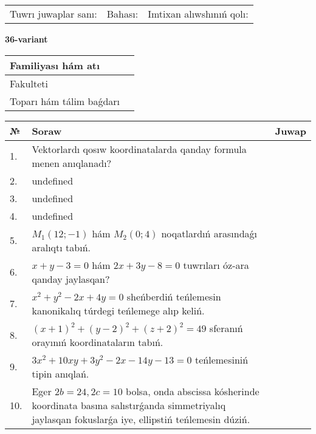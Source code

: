 \documentclass{article}
\begin{document}
\vspace{0.7cm}

\begin{tabular}{lll}
Tuwrı juwaplar sanı: \underline{\hspace{1cm}} & 
Bahası: \underline{\hspace{1cm}} & 
Imtixan alıwshınıń qolı: \underline{\hspace{2cm}} \\
\end{tabular}

\egroup

\newpage


\textbf{36-variant}\\

\bgroup
\def\arraystretch{1.6} %

\begin{tabular}{|m{5.7cm}|m{9.5cm}|}
\hline
Familiyası hám atı & \\
\hline
Fakulteti  & \\
\hline
Toparı hám tálim baǵdarı  & \\
\hline
\end{tabular}

\vspace{0.7cm}

\begin{tabular}{|m{0.7cm}|m{10cm}|m{4cm}|}
\hline
№ & Soraw & Juwap \\
\hline
1. & Vektorlardı qosıw koordinatalarda qanday formula menen anıqlanadı? &  \\
\hline
2. & undefined &  \\
\hline
3. & undefined &  \\
\hline
4. & undefined &  \\
\hline
5. & \(M_{1} (12; - 1)\) hám \(M_{2} (0;4)\) noqatlardıń arasındaǵı aralıqtı tabıń. &  \\
\hline
6. & \(x + y - 3 = 0\) hám \(2 x + 3 y - 8 = 0\) tuwrıları óz-ara qanday jaylasqan? &  \\
\hline
7. & \(x^{2} + y^{2} - 2 x + 4 y = 0\) sheńberdiń teńlemesin kanonikalıq túrdegi teńlemege alıp keliń. &  \\
\hline
8. & \((x + 1) ^{2} + (y - 2) ^{2} + (z + 2) ^{2} = 49\) sferanıń orayınıń koordinataların tabıń. &  \\
\hline
9. & \(3 x^{2} + 10 xy + 3 y^{2} - 2 x - 14 y - 13 = 0\) teńlemesiniń tipin anıqlań. &  \\
\hline
10. & Eger \(2 b = 24, 2 c = 10\) bolsa, onda abscissa kósherinde koordinata basına salıstırǵanda simmetriyalıq jaylasqan fokuslarǵa iye, ellipstiń teńlemesin dúziń. & \\
\hline
\end{tabular}
\end{document}
